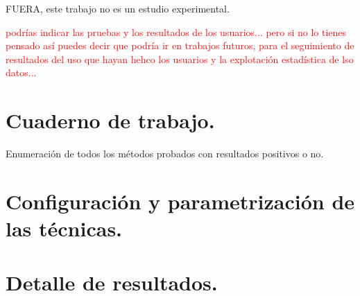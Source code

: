 

FUERA, este trabajo no es un estudio experimental.

\textcolor{red}{podrías indicar las pruebas y los resultados de los usuarios... pero si no lo tienes pensado así puedes decir que podría ir en trabajos futuros, para el seguimiento de resultados del uso que hayan hehco los usuarios y la explotación estadística de lso datos...}

\section{Cuaderno de trabajo.}

Enumeración de todos los métodos probados con resultados positivos o no.
\section{Configuración y parametrización de las técnicas.}

\section{Detalle de resultados.}

